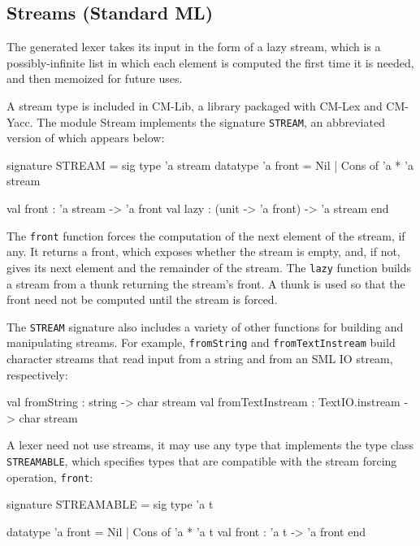 \documentclass[10pt]{article}
\begin{document}
\subsection{Streams (Standard ML)}

The generated lexer takes its input in the form of a lazy stream,
which is a possibly-infinite list in which each element is computed
the first time it is needed, and then memoized for future uses.

A stream type is included in CM-Lib, a library packaged with CM-Lex
and CM-Yacc.  The module Stream implements the signature {\tt STREAM}, an
abbreviated version of which appears below:

\begin{code}
signature STREAM =
   sig
      type 'a stream
      datatype 'a front = Nil | Cons of 'a * 'a stream

      val front : 'a stream -> 'a front
      val lazy : (unit -> 'a front) -> 'a stream
   end
\end{code}


The {\tt front} function forces the computation of the next element of the
stream, if any.  It returns a front, which exposes whether the stream
is empty, and, if not, gives its next element and the remainder of the
stream.  The {\tt lazy} function builds a stream from a thunk returning
the stream's front.  A thunk is used so that the front need not be
computed until the stream is forced.

The {\tt STREAM} signature also includes a variety of other functions for
building and manipulating streams.  For example, {\tt fromString} and
{\tt fromTextInstream} build character streams that read input from a string
and from an SML IO stream, respectively:

\begin{code}
val fromString : string -> char stream
val fromTextInstream : TextIO.instream -> char stream
\end{code}

A lexer need not use streams, it may use any type that implements the
type class {\tt STREAMABLE}, which specifies types that are compatible with
the stream forcing operation, {\tt front}:

\begin{code}
signature STREAMABLE =
   sig
      type 'a t

      datatype 'a front = Nil | Cons of 'a * 'a t
      val front : 'a t -> 'a front
   end
\end{code}
\end{document}
